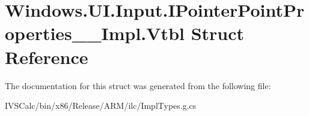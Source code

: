 \hypertarget{struct_windows_1_1_u_i_1_1_input_1_1_i_pointer_point_properties_____impl_1_1_vtbl}{}\section{Windows.\+U\+I.\+Input.\+I\+Pointer\+Point\+Properties\+\_\+\+\_\+\+Impl.\+Vtbl Struct Reference}
\label{struct_windows_1_1_u_i_1_1_input_1_1_i_pointer_point_properties_____impl_1_1_vtbl}


The documentation for this struct was generated from the following file\+:\begin{DoxyCompactItemize}
\item 
I\+V\+S\+Calc/bin/x86/\+Release/\+A\+R\+M/ilc/Impl\+Types.\+g.\+cs\end{DoxyCompactItemize}
